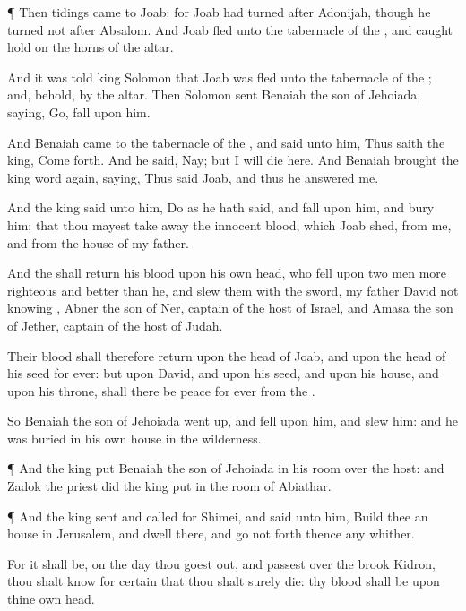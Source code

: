 {\par }{\PP {}¶ Then
tidings
came to
Joab: for
Joab had
turned
after
Adonijah, though he
turned not
after
Absalom. And
Joab
fled unto the
tabernacle of the
{}, and caught
hold on the
horns of the
altar.

And it was
told
king
Solomon that
Joab was
fled unto the
tabernacle of the
{}; and, behold,
{}
by the
altar. Then
Solomon
sent
Benaiah the
son of
Jehoiada,
saying,
Go,
fall upon him.

And
Benaiah
came to the
tabernacle of the
{}, and
said unto him, Thus
saith the
king, Come
forth. And he
said, Nay; but I will
die here. And
Benaiah
brought the
king
word
again,
saying, Thus
said
Joab, and thus he
answered me.

And the
king
said unto him,
Do as he hath
said, and
fall upon him, and
bury him; that thou mayest take
away the
innocent
blood, which
Joab
shed, from me, and from the
house of my
father.

And the
{} shall
return his
blood upon his own
head, who
fell upon
two
men more
righteous and
better than he, and
slew them with the
sword, my
father
David not
knowing
{},
Abner the
son of
Ner,
captain of the
host of
Israel, and
Amasa the
son of
Jether,
captain of the
host of
Judah.

Their
blood shall therefore
return upon the
head of
Joab, and upon the
head of his
seed for
ever: but upon
David, and upon his
seed, and upon his
house, and upon his
throne, shall there be
peace
for
ever from the
{}.

So
Benaiah the
son of
Jehoiada went
up, and
fell upon him, and
slew him: and he was
buried in his own
house in the
wilderness.


\par }{\PP {}¶ And the
king
put
Benaiah the
son of
Jehoiada in his room over the
host: and
Zadok the
priest did the
king
put in the room of
Abiathar.


\par }{\PP {}¶ And the
king
sent and
called for
Shimei, and
said unto him,
Build thee an
house in
Jerusalem, and
dwell there, and go not
forth thence any
whither.

For it shall be,
{} on the
day thou goest
out, and passest
over the
brook
Kidron, thou shalt
know for
certain that thou shalt
surely
die: thy
blood shall be upon thine own
head.

}
